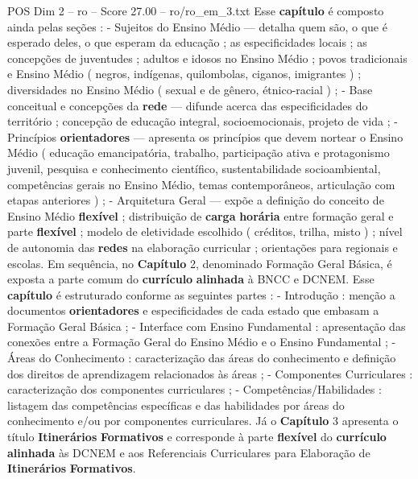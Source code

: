 \begin{textsample}{POS Dim 2 – ro – Score 27.00 – ro/ro\_em\_3.txt}
Esse \textbf{capítulo} é composto ainda pelas seções : - Sujeitos do Ensino Médio — detalha quem são, o que é esperado deles, o que esperam da educação ; as especificidades locais ; as concepções de juventudes ; adultos e idosos no Ensino Médio ; povos tradicionais e Ensino Médio ( negros, indígenas, quilombolas, ciganos, imigrantes ) ; diversidades no Ensino Médio ( sexual e de gênero, étnico-racial ) ; - Base conceitual e concepções da \textbf{rede} — difunde acerca das especificidades do território ; concepção de educação integral, socioemocionais, projeto de vida ; - Princípios \textbf{orientadores} — apresenta os princípios que devem nortear o Ensino Médio ( educação emancipatória, trabalho, participação ativa e protagonismo juvenil, pesquisa e conhecimento científico, sustentabilidade socioambiental, competências gerais no Ensino Médio, temas contemporâneos, articulação com etapas anteriores ) ; - Arquitetura Geral — expõe a definição do conceito de Ensino Médio \textbf{flexível} ; distribuição de \textbf{carga} \textbf{horária} entre formação geral e parte \textbf{flexível} ; modelo de eletividade escolhido ( créditos, trilha, misto ) ; nível de autonomia das \textbf{redes} na elaboração curricular ; orientações para regionais e escolas.
Em sequência, no \textbf{Capítulo} 2, denominado Formação Geral Básica, é exposta a parte comum do \textbf{currículo} \textbf{alinhada} à BNCC e DCNEM.
Esse \textbf{capítulo} é estruturado conforme as seguintes partes : - Introdução : menção a documentos \textbf{orientadores} e especificidades de cada estado que embasam a Formação Geral Básica ; - Interface com Ensino Fundamental : apresentação das conexões entre a Formação Geral do Ensino Médio e o Ensino Fundamental ; - Áreas do Conhecimento : caracterização das áreas do conhecimento e definição dos direitos de aprendizagem relacionados às áreas ; - Componentes Curriculares : caracterização dos componentes curriculares ; - Competências/Habilidades : listagem das competências específicas e das habilidades por áreas do conhecimento e/ou por componentes curriculares.
Já o \textbf{Capítulo} 3 apresenta o título \textbf{Itinerários} \textbf{Formativos} e corresponde à parte \textbf{flexível} do \textbf{currículo} \textbf{alinhada} às DCNEM e aos Referenciais Curriculares para Elaboração de \textbf{Itinerários} \textbf{Formativos}.

\end{textsample}

